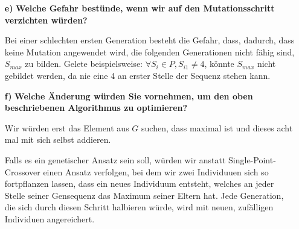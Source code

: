 \documentclass[12pt, twoside]{article}
\begin{document}
\begin{enumerate}[label={\textbf{\alph*)}}]
  \item[\textbf{e)}] \textbf{Welche Gefahr best\"unde, wenn
          wir auf den Mutationsschritt verzichten
          w\"urden?}

        Bei einer schlechten ersten Generation besteht die
        Gefahr, dass, dadurch, dass keine Mutation
        angewendet wird, die folgenden Generationen nicht
        f\"ahig sind, $S_{max}$ zu bilden. Gelete
        beispielsweise: $\forall S_i \in P, S_{i1} \neq 4$,
        k\"onnte $S_{max}$ nicht gebildet werden, da nie
        eine 4 an erster Stelle der Sequenz stehen kann.

  \item[\textbf{f)}] \textbf{Welche \"Anderung w\"urden Sie
          vornehmen, um den oben beschriebenen Algorithmus
          zu optimieren?}

        Wir w\"urden erst das Element aus $G$ suchen, dass
        maximal ist und dieses acht mal mit sich selbst
        addieren.

        Falls es ein genetischer Ansatz sein soll, w\"urden
        wir anstatt Single-Point-Crossover einen Ansatz
        verfolgen, bei dem wir zwei Individuuen sich so
        fortpflanzen lassen, dass ein neues Individuum
        entsteht, welches an jeder Stelle seiner Gensequenz
        das Maximum seiner Eltern hat. Jede Generation, die
        sich durch diesen Schritt halbieren w\"urde, wird
        mit neuen, zuf\"alligen Individuen
        angereichert.

\end{enumerate}
\end{document}
